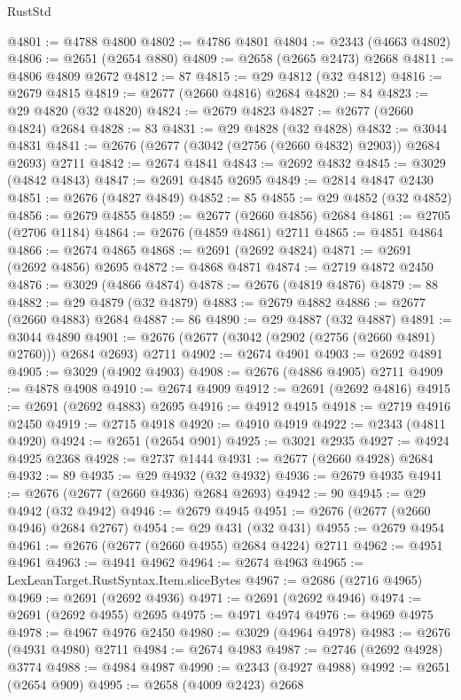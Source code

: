 \begin{lexlean}{RustStd}
\begin{coremodule}
@4801 := @4788 @4800
@4802 := @4786 @4801
@4804 := @2343 (@4663 @4802)
@4806 := @2651 (@2654 @880)
@4809 := @2658 (@2665 @2473) @2668
@4811 := @4806 @4809 @2672
@4812 := 87
@4815 := @29 @4812 (@32 @4812)
@4816 := @2679 @4815
@4819 := @2677 (@2660 @4816) @2684
@4820 := 84
@4823 := @29 @4820 (@32 @4820)
@4824 := @2679 @4823
@4827 := @2677 (@2660 @4824) @2684
@4828 := 83
@4831 := @29 @4828 (@32 @4828)
@4832 := @3044 @4831
@4841 := @2676 (@2677 (@3042 (@2756 (@2660 @4832) @2903)) @2684 @2693) @2711
@4842 := @2674 @4841
@4843 := @2692 @4832
@4845 := @3029 (@4842 @4843)
@4847 := @2691 @4845 @2695
@4849 := @2814 @4847 @2430
@4851 := @2676 (@4827 @4849)
@4852 := 85
@4855 := @29 @4852 (@32 @4852)
@4856 := @2679 @4855
@4859 := @2677 (@2660 @4856) @2684
@4861 := @2705 (@2706 @1184)
@4864 := @2676 (@4859 @4861) @2711
@4865 := @4851 @4864
@4866 := @2674 @4865
@4868 := @2691 (@2692 @4824)
@4871 := @2691 (@2692 @4856) @2695
@4872 := @4868 @4871
@4874 := @2719 @4872 @2450
@4876 := @3029 (@4866 @4874)
@4878 := @2676 (@4819 @4876)
@4879 := 88
@4882 := @29 @4879 (@32 @4879)
@4883 := @2679 @4882
@4886 := @2677 (@2660 @4883) @2684
@4887 := 86
@4890 := @29 @4887 (@32 @4887)
@4891 := @3044 @4890
@4901 := @2676 (@2677 (@3042 (@2902 (@2756 (@2660 @4891) @2760))) @2684 @2693) @2711
@4902 := @2674 @4901
@4903 := @2692 @4891
@4905 := @3029 (@4902 @4903)
@4908 := @2676 (@4886 @4905) @2711
@4909 := @4878 @4908
@4910 := @2674 @4909
@4912 := @2691 (@2692 @4816)
@4915 := @2691 (@2692 @4883) @2695
@4916 := @4912 @4915
@4918 := @2719 @4916 @2450
@4919 := @2715 @4918
@4920 := @4910 @4919
@4922 := @2343 (@4811 @4920)
@4924 := @2651 (@2654 @901)
@4925 := @3021 @2935
@4927 := @4924 @4925 @2368
@4928 := @2737 @1444
@4931 := @2677 (@2660 @4928) @2684
@4932 := 89
@4935 := @29 @4932 (@32 @4932)
@4936 := @2679 @4935
@4941 := @2676 (@2677 (@2660 @4936) @2684 @2693)
@4942 := 90
@4945 := @29 @4942 (@32 @4942)
@4946 := @2679 @4945
@4951 := @2676 (@2677 (@2660 @4946) @2684 @2767)
@4954 := @29 @431 (@32 @431)
@4955 := @2679 @4954
@4961 := @2676 (@2677 (@2660 @4955) @2684 @4224) @2711
@4962 := @4951 @4961
@4963 := @4941 @4962
@4964 := @2674 @4963
@4965 := LexLeanTarget.RustSyntax.Item.sliceBytes
@4967 := @2686 (@2716 @4965)
@4969 := @2691 (@2692 @4936)
@4971 := @2691 (@2692 @4946)
@4974 := @2691 (@2692 @4955) @2695
@4975 := @4971 @4974
@4976 := @4969 @4975
@4978 := @4967 @4976 @2450
@4980 := @3029 (@4964 @4978)
@4983 := @2676 (@4931 @4980) @2711
@4984 := @2674 @4983
@4987 := @2746 (@2692 @4928) @3774
@4988 := @4984 @4987
@4990 := @2343 (@4927 @4988)
@4992 := @2651 (@2654 @909)
@4995 := @2658 (@4009 @2423) @2668

\end{coremodule}
\end{lexlean}
